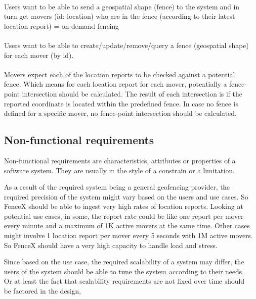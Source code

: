 \documentclass[a4]{report}
\begin{document}
    \paragraph{}
    Users want to be able to send a geospatial shape (fence) to the system and in turn get movers (id: location) who
    are in the fence (according to their latest location report) = on-demand fencing

    \paragraph{}
    Users want to be able to create/update/remove/query a fence (geospatial shape) for each mover (by id).

    \paragraph{}
    Movers expect each of the location reports to be checked against a potential fence.
    Which means for each location report for each mover, potentially a fence-point intersection should be calculated.
    The result of each intersection is if the reported coordinate is located within the predefined fence.
    In case no fence is defined for a specific mover, no fence-point intersection should be calculated.

    \subsection{Non-functional requirements}
    Non-functional requirements are characteristics, attributes or properties of a software system.
    They are usually in the style of a constrain or a limitation.

    As a result of the required system being a general geofencing provider, the required precision of the system might vary
    based on the users and use cases.
    So FenceX should be able to ingest very high rates of location reports.
    Looking at potential use cases, in some, the report rate could be like one report per mover every minute and a maximum of 1K active movers at the same time.
    Other cases might involve 1 location report per mover every 5 seconds with 1M active movers.
    So FenceX should have a very high capacity to handle load and stress.

    Since based on the use case, the required scalability of a system may differ, the users of the system should be able to
    tune the system according to their needs.
    Or at least the fact that scalability requirements are not fixed over time should be factored in the design,
\end{document}
